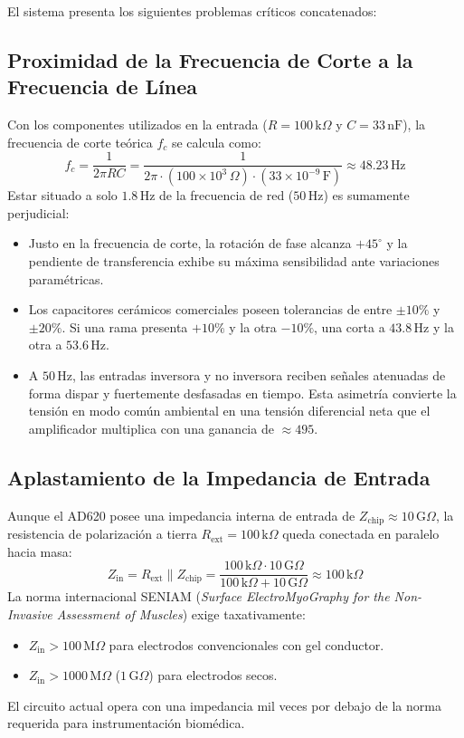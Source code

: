 \documentclass[11pt,a4paper]{article}
\begin{document}
El sistema presenta los siguientes problemas críticos concatenados:

\subsection{Proximidad de la Frecuencia de Corte a la Frecuencia de Línea}
Con los componentes utilizados en la entrada ($R = 100\,\text{k}\Omega$ y $C = 33\,\text{nF}$), la frecuencia de corte teórica $f_c$ se calcula como:
\begin{equation}
f_c = \frac{1}{2\pi R C} = \frac{1}{2\pi \cdot (100 \times 10^3\,\Omega) \cdot (33 \times 10^{-9}\,\text{F})} \approx 48.23\,\text{Hz}
\end{equation}
Estar situado a solo $1.8\,\text{Hz}$ de la frecuencia de red ($50\,\text{Hz}$) es sumamente perjudicial:
\begin{itemize}
    \item Justo en la frecuencia de corte, la rotación de fase alcanza $+45^\circ$ y la pendiente de transferencia exhibe su máxima sensibilidad ante variaciones paramétricas.
    \item Los capacitores cerámicos comerciales poseen tolerancias de entre $\pm 10\%$ y $\pm 20\%$. Si una rama presenta $+10\%$ y la otra $-10\%$, una corta a $43.8\,\text{Hz}$ y la otra a $53.6\,\text{Hz}$.
    \item A $50\,\text{Hz}$, las entradas inversora y no inversora reciben señales atenuadas de forma dispar y fuertemente desfasadas en tiempo. Esta asimetría convierte la tensión en modo común ambiental en una tensión diferencial neta que el amplificador multiplica con una ganancia de $\approx 495$.
\end{itemize}

\subsection{Aplastamiento de la Impedancia de Entrada}
Aunque el AD620 posee una impedancia interna de entrada de $Z_{\text{chip}} \approx 10\,\text{G}\Omega$, la resistencia de polarización a tierra $R_{\text{ext}} = 100\,\text{k}\Omega$ queda conectada en paralelo hacia masa:
\begin{equation}
Z_{\text{in}} = R_{\text{ext}} \parallel Z_{\text{chip}} = \frac{100\,\text{k}\Omega \cdot 10\,\text{G}\Omega}{100\,\text{k}\Omega + 10\,\text{G}\Omega} \approx 100\,\text{k}\Omega
\end{equation}
La norma internacional SENIAM (\textit{Surface ElectroMyoGraphy for the Non-Invasive Assessment of Muscles}) exige taxativamente:
\begin{itemize}
    \item $Z_{\text{in}} > 100\,\text{M}\Omega$ para electrodos convencionales con gel conductor.
    \item $Z_{\text{in}} > 1000\,\text{M}\Omega$ ($1\,\text{G}\Omega$) para electrodos secos.
\end{itemize}
El circuito actual opera con una impedancia mil veces por debajo de la norma requerida para instrumentación biomédica.
\end{document}
